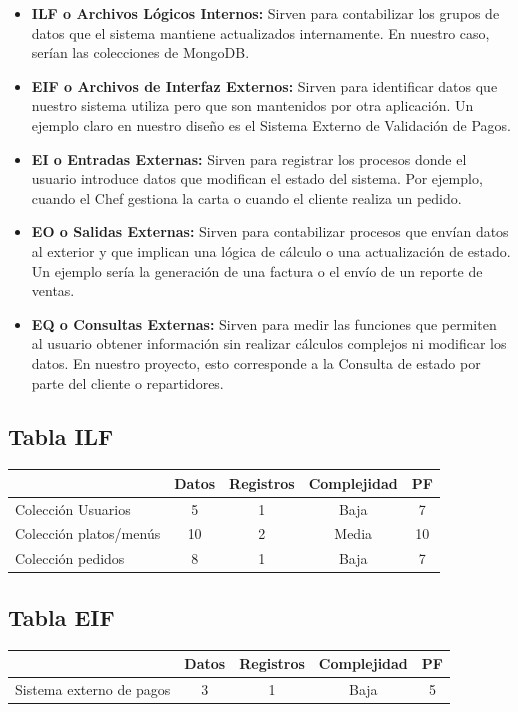 \documentclass[12pt,a4paper]{article}
\begin{document}
\begin{itemize}
    \item \textbf{ILF o Archivos Lógicos Internos:} Sirven para contabilizar los grupos de datos que el sistema mantiene actualizados internamente. En nuestro caso, serían las colecciones de MongoDB.
    \item \textbf{EIF o Archivos de Interfaz Externos:} Sirven para identificar datos que nuestro sistema utiliza pero que son mantenidos por otra aplicación. Un ejemplo claro en nuestro diseño es el Sistema Externo de Validación de Pagos.
    \item \textbf{EI o Entradas Externas:} Sirven para registrar los procesos donde el usuario introduce datos que modifican el estado del sistema. Por ejemplo, cuando el Chef gestiona la carta o cuando el cliente realiza un pedido.
    \item \textbf{EO o Salidas Externas:} Sirven para contabilizar procesos que envían datos al exterior y que implican una lógica de cálculo o una actualización de estado. Un ejemplo sería la generación de una factura o el envío de un reporte de ventas.
    \item \textbf{EQ o Consultas Externas:} Sirven para medir las funciones que permiten al usuario obtener información sin realizar cálculos complejos ni modificar los datos. En nuestro proyecto, esto corresponde a la Consulta de estado por parte del cliente o repartidores.
\end{itemize}

\subsection{Tabla ILF}
\begin{table}[H]
\centering
\begin{tabular}{lcccc}
\toprule
\textbf{} & \textbf{Datos} & \textbf{Registros} & \textbf{Complejidad} & \textbf{PF} \\
\midrule
Colección Usuarios & 5 & 1 & Baja & 7 \\
Colección platos/menús & 10 & 2 & Media & 10 \\
Colección pedidos & 8 & 1 & Baja & 7 \\
\bottomrule
\end{tabular}
\end{table}

\subsection{Tabla EIF}
\begin{table}[H]
\centering
\begin{tabular}{lcccc}
\toprule
\textbf{} & \textbf{Datos} & \textbf{Registros} & \textbf{Complejidad} & \textbf{PF} \\
\midrule
Sistema externo de pagos & 3 & 1 & Baja & 5 \\
\bottomrule
\end{tabular}
\end{table}
\end{document}
